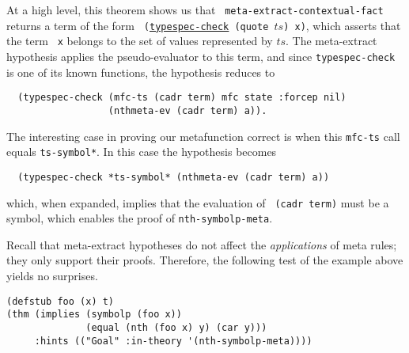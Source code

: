 \noindent At a high level, this theorem shows us that {\tt
  meta-extract-contextual-fact} returns a term of the form {\tt
  (\href{http://www.cs.utexas.edu/users/moore/acl2/manuals/current/manual/index.html?topic=ACL2\_\_\_\_TYPESPEC-CHECK}{\underline{typespec-check}} (quote $ts$) x)}, which asserts that the term {\tt
  x} belongs to the set of values represented by $ts$.  The
meta-extract hypothesis applies the pseudo-evaluator to this term, and
since {\tt typespec-\allowbreak{}check} is one of its known functions, the
hypothesis reduces to
\begin{verbatim}
  (typespec-check (mfc-ts (cadr term) mfc state :forcep nil)
                  (nthmeta-ev (cadr term) a)).
\end{verbatim}
\noindent The interesting case in proving our metafunction correct is
when this {\tt mfc-ts} call equals {\tt *ts-symbol*}.  In this case the hypothesis becomes
\begin{verbatim}
  (typespec-check *ts-symbol* (nthmeta-ev (cadr term) a))
\end{verbatim}
\noindent which, when expanded, implies that the evaluation of {\tt
  (cadr term)} must be a
symbol, which enables the proof of {\tt nth-symbolp-meta}.



Recall that meta-extract hypotheses do not affect the {\em
  applications} of meta rules; they only support their proofs.
Therefore, the following test of the example above yields no surprises.

\begin{verbatim}
(defstub foo (x) t)
(thm (implies (symbolp (foo x))
              (equal (nth (foo x) y) (car y)))
     :hints (("Goal" :in-theory '(nth-symbolp-meta))))
\end{verbatim}


